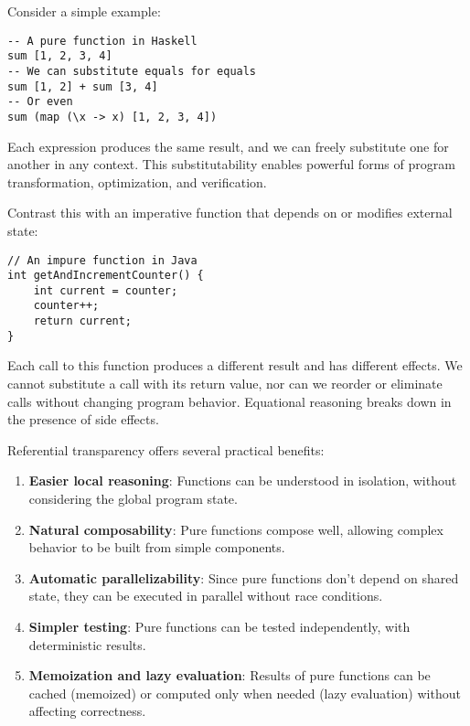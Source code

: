 \documentclass[11pt]{article}
\begin{document}
Consider a simple example:

\begin{verbatim}
-- A pure function in Haskell
sum [1, 2, 3, 4]
-- We can substitute equals for equals
sum [1, 2] + sum [3, 4]
-- Or even
sum (map (\x -> x) [1, 2, 3, 4])
\end{verbatim}

Each expression produces the same result, and we can freely substitute one for another in any context. This substitutability enables powerful forms of program transformation, optimization, and verification.

Contrast this with an imperative function that depends on or modifies external state:

\begin{verbatim}
// An impure function in Java
int getAndIncrementCounter() {
    int current = counter;
    counter++;
    return current;
}
\end{verbatim}

Each call to this function produces a different result and has different effects. We cannot substitute a call with its return value, nor can we reorder or eliminate calls without changing program behavior. Equational reasoning breaks down in the presence of side effects.

Referential transparency offers several practical benefits:

\begin{enumerate}
\item \textbf{Easier local reasoning}: Functions can be understood in isolation, without considering the global program state.

\item \textbf{Natural composability}: Pure functions compose well, allowing complex behavior to be built from simple components.

\item \textbf{Automatic parallelizability}: Since pure functions don't depend on shared state, they can be executed in parallel without race conditions.

\item \textbf{Simpler testing}: Pure functions can be tested independently, with deterministic results.

\item \textbf{Memoization and lazy evaluation}: Results of pure functions can be cached (memoized) or computed only when needed (lazy evaluation) without affecting correctness.
\end{enumerate}
\end{document}
